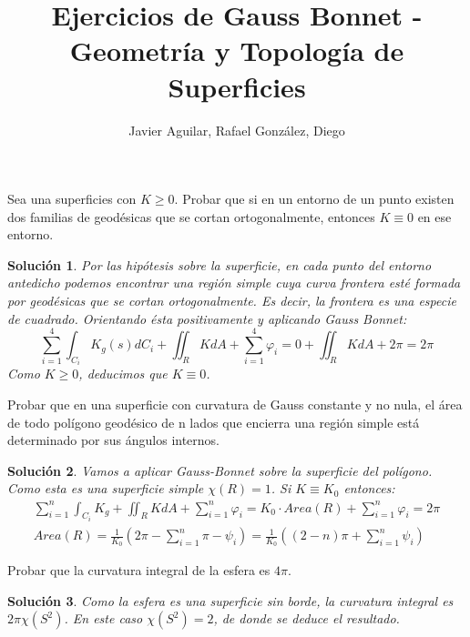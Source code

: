 \documentclass[twoside]{report}
\theoremstyle{plain}
\newtheorem*{sol*}{Solución}
\newenvironment{ejercicio}[2][Estado]{\begin{trivlist}
\item[\hskip \labelsep {\bfseries Ejercicio}\hskip \labelsep {\bfseries #2.}]}{\end{trivlist}}
\begin{document}
\title{Ejercicios de Gauss Bonnet - Geometría y Topología de Superficies }
\author{Javier Aguilar, Rafael González, Diego}
\maketitle
\begin{ejercicio}{1} Sea una superficies con $K\geq 0$. Probar que si en un entorno de un punto existen dos familias de geodésicas que se cortan ortogonalmente, entonces $K\equiv 0$ en ese entorno. 
\end{ejercicio}
\begin{sol*}
Por las hipótesis sobre la superficie, en cada punto del entorno antedicho podemos encontrar una región simple cuya curva frontera esté formada por geodésicas que se cortan ortogonalmente. Es decir, la frontera es una especie de cuadrado. Orientando ésta positivamente y aplicando Gauss Bonnet: 
\[
\sum_{i=1}^4\int_{C_i}K_g(s) dC_i + \iint_R KdA + \sum_{i=1}^4 \varphi_i = 0 + \iint_R KdA + 2\pi = 2\pi
\]
Como $K\geq 0$, deducimos que $K\equiv 0$.
\end{sol*}
\newpage


\begin{ejercicio}{2} Probar que en una superficie con curvatura de Gauss constante y no nula, el área de todo polígono geodésico de n lados que encierra una región simple está determinado por sus ángulos internos.
\end{ejercicio}
\begin{sol*}
Vamos a aplicar Gauss-Bonnet sobre la superficie del polígono. Como esta es una superficie simple $\chi(R)=1$. Si $K\equiv K_0$ entonces:
\begin{gather*}
\sum_{i=1}^n \int_{C_i}K_g + \iint_R KdA + \sum_{i=1}^{n} \varphi_i = K_0 \cdot Area(R)+\sum_{i=1}^{n} \varphi_i = 2\pi \\
Area(R) = \frac{1}{K_0}\left(2\pi - \sum_{i=1}^n \pi - \psi_i\right)=  \frac{1}{K_0}\left((2-n)\pi + \sum_{i=1}^n \psi_i\right) \end{gather*}
\end{sol*}
\newpage

\begin{ejercicio}{3} Probar que la curvatura integral de la esfera es $4\pi$. 
\end{ejercicio}
\begin{sol*}
Como la esfera es una superficie sin borde, la curvatura integral es $2\pi\chi(S^2)$. En este caso $\chi(S^2)=2$, de donde se deduce el resultado.
\end{sol*}
\end{document}
